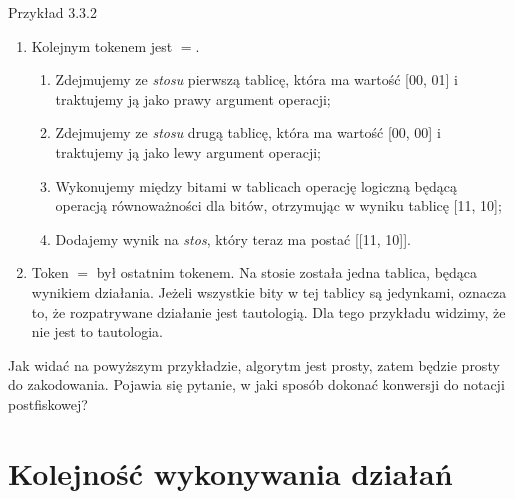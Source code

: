\documentclass{SGGW-thesis}
\begin{document}
\begin{paragraph}{Przykład 3.3.2\label{ex:3.3.2}}
\begin{enumerate}
\begin{enumerate}
            \item Dodajemy ją na \emph{stos}, który teraz ma postać [[00, 01], [00, 00]].
        \end{enumerate}
        \item Kolejnym tokenem jest $=$.
        \begin{enumerate}
            \item Zdejmujemy ze \emph{stosu} pierwszą tablicę, która ma wartość [00, 01] i traktujemy ją jako prawy argument operacji;
            \item Zdejmujemy ze \emph{stosu} drugą tablicę, która ma wartość [00, 00] i traktujemy ją jako lewy argument operacji;
            \item Wykonujemy między bitami w tablicach operację logiczną będącą operacją równoważności dla bitów, otrzymując w wyniku tablicę [11, 10];
            \item Dodajemy wynik na \emph{stos}, który teraz ma postać [[11, 10]].
        \end{enumerate}
        \item Token $=$ był ostatnim tokenem. Na stosie została jedna tablica, będąca wynikiem działania. Jeżeli wszystkie bity w tej tablicy są jedynkami, oznacza to, że rozpatrywane działanie jest tautologią. Dla tego przykładu widzimy, że nie jest to tautologia.
    \end{enumerate}
    Jak widać na powyższym przykładzie, algorytm jest prosty, zatem będzie prosty do zakodowania. Pojawia się pytanie, w jaki sposób dokonać konwersji do notacji postfiskowej?
\end{paragraph}

\section{Kolejność wykonywania działań}
\end{document}
